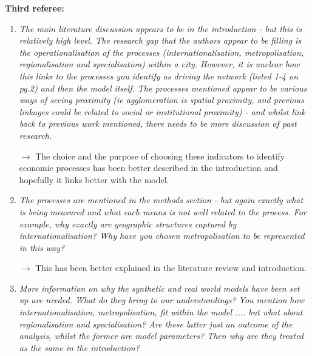 \documentclass[10pt,a4paper,sans]{moderncv}
\begin{document}
\bigskip

\textbf{Third referee:}

\medskip


\begin{enumerate}

	\item \textit{The main literature discussion appears to be in the introduction - but this is relatively high level. The research gap that the authors appear to be filling is the operationalisation of the processes (internationalisation, metropolisation, regionalisation and specialisation) within a city. However, it is unclear how this links to the processes you identify as driving the network (listed 1-4 on pg.2) and then the model itself. The processes mentioned appear to be various ways of seeing proximity (ie agglomeration is spatial proximity, and previous linkages could be related to social or institutional proximity) - and whilst link back to previous work mentioned, there needs to be more discussion of past research.}
	
	$\rightarrow$ The choice and the purpose of choosing these indicators to identify economic processes has been better described in the introduction and hopefully it links better with the model.
	
	\medskip

	\item \textit{The processes are mentioned in the methods section - but again exactly what is being measured and what each means is not well related to the process. For example, why exactly are geographic structures captured by internationalisation? Why have you chosen metropolisation to be represented in this way?}

	$\rightarrow$ This has been better explained in the literature review and introduction.
	
	\medskip

	\item \textit{More information on why the synthetic and real world models have been set up are needed. What do they bring to our understandings? You mention how internationalisation, metropolisation, fit within the model .... but what about regionalisation and specialisation? Are these latter just an outcome of the analysis, whilst the former are model parameters? Then why are they treated as the same in the introduction?}


\end{enumerate}
\end{document}
